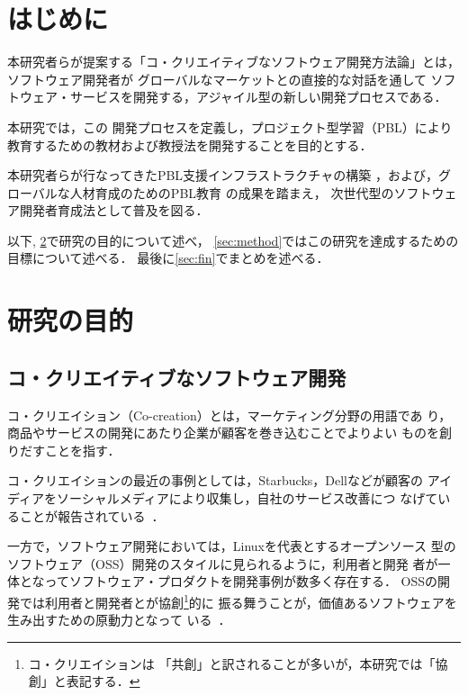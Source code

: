\documentclass[a4j,9pt,twoside]{jarticle}
\begin{document}
\renewcommand{\thefootnote}{*\arabic{footnote}}
\setcounter{footnote}{0}
\begin{multicols}{2} %
\small %

\section{はじめに}

	本研究者らが提案する「コ・クリエイティブなソフトウェア開発方法論」とは，ソフトウェア開発者が
	グローバルなマーケットとの直接的な対話を通して
	ソフトウェア・サービスを開発する，アジャイル型の新しい開発プロセスである．
	
	本研究では，この
	開発プロセスを定義し，プロジェクト型学習（PBL）により教育するための教材および教授法を開発することを目的とする．

	本研究者らが行なってきたPBL支援インフラストラクチャの構築
	\cite{pub:chubachi-ipbl-2012}\cite{pub:chubachi-ipbl-2011}%
	\cite{pub:chubachi-ipbl-2009b}\cite{pub:chubachi-ipbl-2009a}%
	，および，グローバルな人材育成のためのPBL教育
	\cite{pub:chubachi-global-2010}\cite{pub:nishino-2010}%
	の成果を踏まえ，
	次世代型のソフトウェア開発者育成法として普及を図る．
	
	以下,
	\ref{sec:purpose}で研究の目的について述べ，
	\ref{sec:method}ではこの研究を達成するための目標について述べる．
	最後に\ref{sec:fin}でまとめを述べる．
	
\section{研究の目的}\label{sec:purpose}
\subsection{コ・クリエイティブなソフトウェア開発}

    コ・クリエイション（Co-creation）とは，マーケティング分野の用語であ
    り，商品やサービスの開発にあたり企業が顧客を巻き込むことでよりよい
    ものを創りだすことを指す．
    
    コ・クリエイションの最近の事例としては，Starbucks，Dellなどが顧客の
    アイディアをソーシャルメディアにより収集し，自社のサービス改善につ
    なげていることが報告されている~\cite{wired}．

    一方で，ソフトウェア開発においては，Linuxを代表とするオープンソース
    型のソフトウェア（OSS）開発のスタイルに見られるように，利用者と開発
    者が一体となってソフトウェア・プロダクトを開発事例が数多く存在する．
    OSSの開発では利用者と開発者とが協創\footnote{コ・クリエイションは
    「共創」と訳されることが多いが，本研究では「協創」と表記する．}的に
    振る舞うことが，価値あるソフトウェアを生み出すための原動力となって
    いる~\cite{oss}．
    

\end{multicols}
\end{document}
